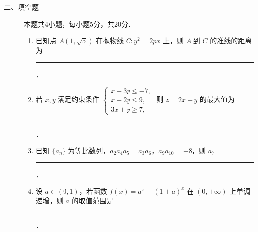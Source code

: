 \begin{description}
    \item[二、填空题] 本题共4小题，每小题5分，共20分．
    \begin{enumerate}[leftmargin=5pt]
      \addtocounter{enumi}{+12}
        \item 已知点 $A(1,\sqrt{5})$ 在抛物线 $C:y^2=2px$ 上，则 $A$ 到 $C$ 的准线的距离为 \rule[-0.3ex]{3em}{0.4pt}．
        \item 若 $x,y$ 满足约束条件 $\begin{cases}x-3y\leqslant-7,\\x+2y\leqslant9,\\3x+y\geqslant7,\end{cases}$ 则 $z=2x-y$ 的最大值为 \rule[-0.3ex]{3em}{0.4pt}．
        \item 已知 $\{a_n\}$ 为等比数列，$a_2a_4a_5=a_3a_6$，$a_9a_{10}=-8$，则 $a_7=$ \rule[-0.3ex]{3em}{0.4pt}．
        \item 设 $a\in(0,1)$，若函数 $f(x)=a^x+(1+a)^x$ 在 $(0,+\infty)$ 上单调递增，则 $a$ 的取值范围是 \rule[-0.3ex]{3em}{0.4pt}．
    \end{enumerate}
\end{description}

